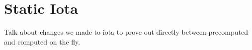 \section{Static Iota}\label{sec:iota}
Talk about changes we made to iota to prove out directly between precomputed and computed on the fly.